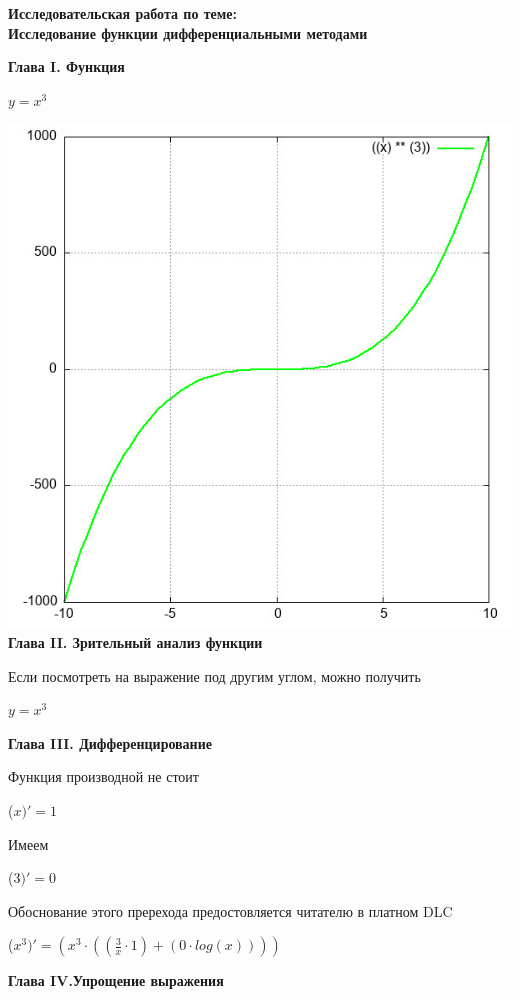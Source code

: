 \documentclass[12pt,a4paper,fleqn]{article}
\begin{document}
\begin{center}
\textbf{\LARGE{Исследовательская работа по теме:\\Исследование функции дифференциальными методами}}\end{center}\newpage\textbf{\LARGE Глава I. Функция}

\begin{center}
$y = $$x^{3}$\end{center}
\includegraphics{GraphicDumps/plot.jpg}\newpage \textbf{\LARGE Глава II. Зрительный анализ функции}

Если посмотреть на выражение под другим углом, можно получить

\begin{center}
$y = $$x^{3}$\end{center}
\newpage \textbf{\LAGRE Глава III. Дифференцирование}

Функция производной не стоит

\begin{center}
 ($x)'
  = 1$\end{center}
Имеем

\begin{center}
 ($3)'
  = 0$\end{center}
Обоснование этого пререхода предостовляется читателю в платном DLC

\begin{center}
 ($x^{3})'
  = (x^{3} \cdot ((\frac{3}{x} \cdot 1) + (0 \cdot log(x))))$\end{center}
\newpage \textbf{\LARGE Глава IV.Упрощение выражения}
\end{document}
